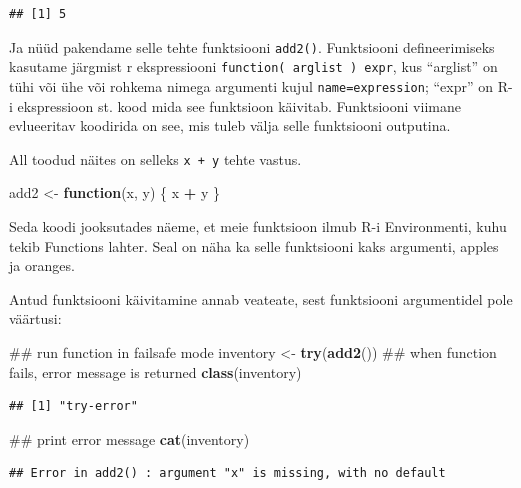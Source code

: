 \documentclass[]{book}
\newenvironment{Shaded}{\begin{snugshade}}{\end{snugshade}}
\newcommand{\KeywordTok}[1]{\textcolor[rgb]{0.13,0.29,0.53}{\textbf{#1}}}
\newcommand{\StringTok}[1]{\textcolor[rgb]{0.31,0.60,0.02}{#1}}
\newcommand{\ControlFlowTok}[1]{\textcolor[rgb]{0.13,0.29,0.53}{\textbf{#1}}}
\newcommand{\OperatorTok}[1]{\textcolor[rgb]{0.81,0.36,0.00}{\textbf{#1}}}
\newcommand{\NormalTok}[1]{#1}
\begin{document}
\begin{verbatim}
## [1] 5
\end{verbatim}

Ja nüüd pakendame selle tehte funktsiooni \texttt{add2()}. Funktsiooni
defineerimiseks kasutame järgmist r ekspressiooni
\texttt{function(\ arglist\ )\ expr}, kus ``arglist'' on tühi või ühe
või rohkema nimega argumenti kujul \texttt{name=expression}; ``expr'' on
R-i ekspressioon st. kood mida see funktsioon käivitab. Funktsiooni
viimane evlueeritav koodirida on see, mis tuleb välja selle funktsiooni
outputina.

All toodud näites on selleks \texttt{x\ +\ y} tehte vastus.

\begin{Shaded}
\begin{Highlighting}[]
\NormalTok{add2 <-}\StringTok{ }\ControlFlowTok{function}\NormalTok{(x, y) \{}
\NormalTok{    x }\OperatorTok{+}\StringTok{ }\NormalTok{y}
\NormalTok{\}}
\end{Highlighting}
\end{Shaded}

Seda koodi jooksutades näeme, et meie funktsioon ilmub R-i Environmenti,
kuhu tekib Functions lahter. Seal on näha ka selle funktsiooni kaks
argumenti, apples ja oranges.

Antud funktsiooni käivitamine annab veateate, sest funktsiooni
argumentidel pole väärtusi:

\begin{Shaded}
\begin{Highlighting}[]
\NormalTok{## run function in failsafe mode}
\NormalTok{inventory <-}\StringTok{ }\KeywordTok{try}\NormalTok{(}\KeywordTok{add2}\NormalTok{())}
\NormalTok{## when function fails, error message is returned}
\KeywordTok{class}\NormalTok{(inventory)}
\end{Highlighting}
\end{Shaded}

\begin{verbatim}
## [1] "try-error"
\end{verbatim}

\begin{Shaded}
\begin{Highlighting}[]
\NormalTok{## print error message}
\KeywordTok{cat}\NormalTok{(inventory)}
\end{Highlighting}
\end{Shaded}

\begin{verbatim}
## Error in add2() : argument "x" is missing, with no default
\end{verbatim}
\end{document}

